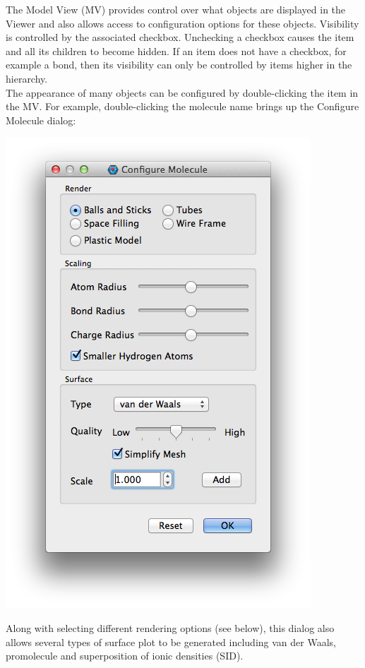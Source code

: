 \documentclass[a4paper,12pt]{article}
\begin{document}
The Model View (MV) provides control over what objects are displayed in the Viewer
and also allows access to configuration options for these objects.  Visibility is
controlled by the associated checkbox.  Unchecking a checkbox causes the item
and all its children to become hidden.  If an item does not have a checkbox,
for example a bond, then its visibility can only be controlled by items higher
in the hierarchy.  \\

The appearance of many objects can be configured by double-clicking the item in
the MV.  For example, double-clicking the molecule name brings up the Configure
Molecule dialog:
\begin{center}
\includegraphics[scale=0.40]{figures/MoleculeConfigurator.png}
\end{center}
Along with selecting different rendering options (see below), this
dialog also allows several types of surface plot to be generated including van
der Waals, promolecule and superposition of ionic densities (SID). \\
\end{document}
